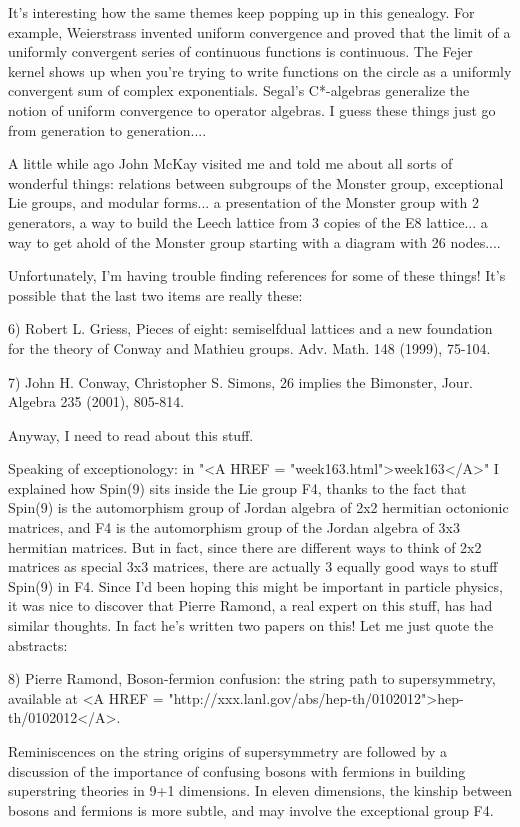 It's interesting how the same themes keep popping up in this
genealogy.  For example, Weierstrass invented uniform convergence and
proved that the limit of a uniformly convergent series of continuous
functions is continuous.  The Fejer kernel shows up when you're trying
to write functions on the circle as a uniformly convergent sum of
complex exponentials.  Segal's C*-algebras generalize the notion of
uniform convergence to operator algebras.  I guess these things just
go from generation to generation....

A little while ago John McKay visited me and told me about all sorts of
wonderful things: relations between subgroups of the Monster group,
exceptional Lie groups, and modular forms... a presentation of the
Monster group with 2 generators, a way to build the Leech lattice from 3
copies of the E8 lattice... a way to get ahold of the Monster group
starting with a diagram with 26 nodes....

Unfortunately, I'm having trouble finding references for some of these
things!  It's possible that the last two items are really these:


6) Robert L. Griess, Pieces of eight: semiselfdual lattices and a new
foundation for the theory of Conway and Mathieu groups. Adv. Math. 148
(1999), 75-104.  

7) John H. Conway, Christopher S. Simons, 26 implies the Bimonster,
Jour. Algebra 235 (2001), 805-814.

Anyway, I need to read about this stuff.


Speaking of exceptionology: in "<A HREF =
"week163.html">week163</A>" I explained how Spin(9) sits inside the
Lie group F4, thanks to the fact that Spin(9) is the automorphism group
of Jordan algebra of 2x2 hermitian octonionic matrices, and F4 is the
automorphism group of the Jordan algebra of 3x3 hermitian matrices.  But
in fact, since there are different ways to think of 2x2 matrices as
special 3x3 matrices, there are actually 3 equally good ways to stuff
Spin(9) in F4.  Since I'd been hoping this might be important in
particle physics, it was nice to discover that Pierre Ramond, a real
expert on this stuff, has had similar thoughts.  In fact he's written
two papers on this!  Let me just quote the abstracts:

8) Pierre Ramond, Boson-fermion confusion: the string path to
supersymmetry, available at <A HREF = "http://xxx.lanl.gov/abs/hep-th/0102012">hep-th/0102012</A>.

Reminiscences on the string origins of supersymmetry are followed by a
discussion of the importance of confusing bosons with fermions in
building superstring theories in 9+1 dimensions. In eleven dimensions,
the kinship between bosons and fermions is more subtle, and may
involve the exceptional group F4.

